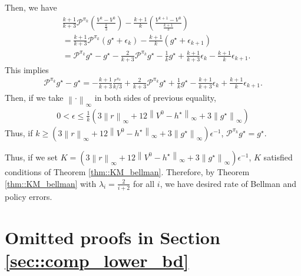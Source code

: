 \documentclass{article} %
\newcommand{\cP}{\mathcal{P}}
\newcommand*{\para}[1]{\left({#1}\right)}
\newcommand*{\infn}[1]{\left\|{#1}\right\|_{\infty}}
\begin{document}
        Then, we have
        \begin{align*}
        &\frac{k+1}{k+3}\cP^{\pi_k}\para{\frac{V^{k}-V^0}{\frac{k}{3}} }-\frac{k+1}{k}\para{\frac{V^{k+1}-V^0}{\frac{k+1}{3}}} 
        \\&= \frac{k+1}{k+3}\cP^{\pi_k}\para{g^{\star}+\epsilon_k }-\frac{k+1}{k}\para{g^{\star}+\epsilon_{k+1} }\\
             &= \cP^{\pi_k}g^{\star}-g^{\star}-\frac{2}{k+3} \cP^{\pi_k}g^{\star}-\frac{1}{k}g^{\star}+\frac{k+1}{k+3}\epsilon_k -\frac{k+1}{k}\epsilon_{k+1}.
    \end{align*}
    This implies
    \begin{align*}
        \cP^{\pi_k}g^{\star}-g^{\star} = -\frac{k+1}{k+3}\frac{r^{\pi_k}}{k/3}+\frac{2}{k+3} \cP^{\pi_k}g^{\star}+\frac{1}{k}g^{\star}-\frac{k+1}{k+3}\epsilon_k +\frac{k+1}{k}\epsilon_{k+1}. 
    \end{align*}
     Then, if we take $\infn{\cdot}$ in both sides of previous equality,
        \begin{align*}
        0 < \epsilon \le  \frac{1}{k}\para{3\infn{r}+12\infn{V^0-h^{\star}} +3\infn{g^{\star}}}  
    \end{align*}
    Thus, if  $k \ge\para{3\infn{r}+12\infn{V^0-h^{\star}} +3\infn{g^{\star}}}\epsilon^{-1}$, $\cP^{\pi_k}g^{\star} =g^{\star}$.

    Thus, if we set $K=\para{3\infn{r}+12\infn{V^0-h^{\star}} +3\infn{g^{\star}}}\epsilon^{-1}$, $K$ satisfied conditions of Theorem \ref{thm::KM_bellman}. Therefore, by  Theorem \ref{thm::KM_bellman} with $\lambda_i=\frac{2}{i+2}$ for all $i$, we have desired rate of Bellman and policy errors.

\section{Omitted proofs in Section \ref{sec::comp_lower_bd}}
\end{document}
